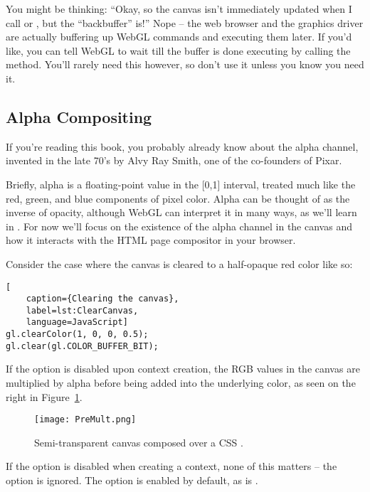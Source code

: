 You might be thinking: ``Okay, so the canvas isn't immediately updated when I call  or , but the ``backbuffer'' is!''  Nope -- the web browser and the graphics driver are actually buffering up WebGL commands and executing them later.  If you'd like, you can tell WebGL to wait till the buffer is done executing by calling the   method.  You'll rarely need this however, so don't use it unless you know you need it.

\subsection{Alpha Compositing}

If you're reading this book, you probably already know about the alpha channel, invented in the late 70's by Alvy Ray Smith, one of the co-founders of Pixar.

Briefly, alpha is a floating-point value in the [0,1] interval, treated much like the red, green, and blue components of pixel color.  Alpha can be thought of as the inverse of opacity, although WebGL can interpret it in many ways, as we'll learn in .  For now we'll focus on the existence of the alpha channel in the canvas and how it interacts with the HTML page compositor in your browser.

Consider the case where the canvas is cleared to a half-opaque red color like so:

\begin{lstlisting}[
    caption={Clearing the canvas},
    label=lst:ClearCanvas,
    language=JavaScript]
gl.clearColor(1, 0, 0, 0.5);
gl.clear(gl.COLOR_BUFFER_BIT);
\end{lstlisting}

If the  option is disabled upon context creation, the RGB values in the canvas are multiplied by alpha before being added into the underlying color, as seen on the right in Figure~\ref{fig:PreMult}.

\begin{figure}[htb]\centering
  \texttt{[image: PreMult.png]}
  \caption{Semi-transparent canvas composed over a CSS .}
  \label{fig:PreMult}
\end{figure}

\begin{sidenote}
If the  option is disabled when creating a context, none of this matters -- the  option is ignored.  The  option is enabled by default, as is .
\end{sidenote}

